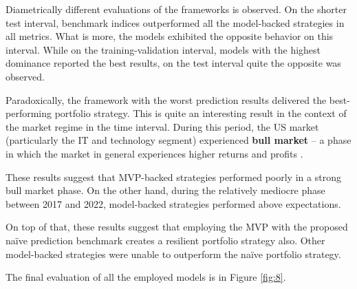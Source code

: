 \documentclass{svk_en}
\begin{document}
\begin{table}[H]
\centering
{}
\caption{\centering Evaluation of tuned models on test interval.}
\label{tab:6}
\end{table}

Diametrically different evaluations of the frameworks is observed. On the shorter test interval,
benchmark indices outperformed all the model-backed strategies in all metrics. What is more, the models exhibited the opposite
behavior on this interval. While on the training-validation interval, models with the highest dominance
reported the best results, on the test interval quite the opposite was observed.

Paradoxically, the framework with the worst prediction results delivered the best-performing portfolio strategy.
This is quite an interesting result in the context of the market regime in the time interval. During this period, the US market (particularly the IT and technology segment)
experienced \textbf{bull market} -- a phase in which the market in general experiences higher returns and profits \cite{bull}.

These results suggest that MVP-backed strategies performed poorly in a strong bull market phase. On the other hand, during the relatively mediocre phase
between 2017 and 2022, model-backed strategies performed above expectations. 

On top of that, these results suggest that employing the MVP with the proposed naïve prediction benchmark creates a resilient portfolio strategy also. Other model-backed strategies
were unable to outperform the naïve portfolio strategy.

The final evaluation of all the employed models is in Figure \ref{fig:8}.
\end{document}
